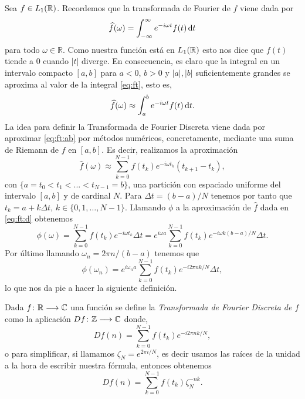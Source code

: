 \documentclass{article}
\begin{document}
Sea $f \in L_1(\mathbb{R})$. Recordemos que la transformada de Fourier de $f$ viene dada por
\begin{equation} \label{eq:ft}
\widehat{f}(\omega)=\int_{-\infty}^\infty e^{-i\omega t}f(t)\,\mathrm{d} t
\end{equation}
para todo $\omega \in \mathbb{R}$. Como nuestra función está en $L_1(\mathbb{R})$ esto nos dice que $f(t)$ tiende a $0$ cuando $|t|$ diverge. En consecuencia, es claro que la integral en un intervalo compacto $[a,b]$ para $a<0$, $b>0$ y $|a|, |b|$ suficientemente grandes se aproxima al valor de la integral \eqref{eq:ft}, esto es,
 \begin{equation} \label{eq:ft:ab}
 \widehat{f}(\omega) \approx \int_{a}^b e^{-i\omega t}f(t)\,\mathrm{d} t.
 \end{equation}
 La idea para definir la Transformada de Fourier Discreta viene dada por aproximar \eqref{eq:ft:ab} por métodos numéricos, concretamente, mediante una suma de Riemann de $f$ en $[a,b]$. Es decir, realizamos la aproximación
 \begin{equation} \label{eq:ft:d}
 \widehat{f}(\omega) \approx \sum_{k=0}^{N-1}f(t_k)e^{-i\omega t_k} (t_{k+1} - t_{k}),
 \end{equation}
 con $\{a=t_0<t_1<...<t_{N-1}=b\}$, una partición con espaciado uniforme del intervalo $[a,b]$ y de cardinal $N$. Para $\Delta t =(b-a)/ N$ tenemos por tanto que $t_k=a+k\Delta t$, $k \in \{0,1, \ldots, N-1\}$. Llamando $\phi$ a la aproximación de $\widehat{f}$ dada en \eqref{eq:ft:d} obtenemos 
 \[
 \phi(\omega)=\sum_{k=0}^{N-1} f(t_k)e^{-i\omega t_k }\Delta t=e^{i\omega a}\sum_{k=0}^{N-1} f(t_k)e^{-i\omega k (b-a)/N  }\Delta t.
 \]
 Por último llamando $\omega_n=2\pi n / (b-a)$ tenemos que 
 \[
 \phi(\omega_n)=e^{i\omega_n a}\sum_{k=0}^{N-1}f(t_k)e^{-i2\pi nk/N}\Delta t,
 \]
 lo que nos da pie a hacer la siguiente definición.
 
 Dada $f\colon\mathbb{R} \longrightarrow \mathbb{C}$ una función se define la \emph{Transformada de Fourier Discreta de $f$} como la aplicación $Df\colon\mathbb{Z} \longrightarrow \mathbb{C}$ donde, 
 \[
 Df(n) = \sum_{k=0}^{N-1}f(t_k)e^{-i2\pi nk/N},
 \]
 o para simplificar, si llamamos $\zeta_N=e^{2\pi i/N}$, es decir usamos las raíces de la unidad a la hora de escribir nuestra fórmula, entonces obtenemos
 \[
Df(n) = \sum_{k=0}^{N-1}f(t_k)\zeta_N^{-nk}.
 \]
\end{document}
